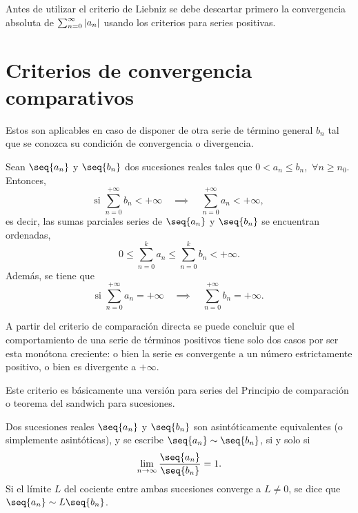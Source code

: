 \begin{note}
    Antes de utilizar el criterio de Liebniz se debe descartar primero la convergencia absoluta de $\sum_{n=0}^\infty \left\vert a_n \right\vert$ usando los criterios para series positivas.
\end{note}

\section{Criterios de convergencia comparativos}
Estos son aplicables en caso de disponer de otra serie de término general $b_n$ tal que se conozca su condición de convergencia o divergencia.

\begin{prop}
    Sean $\seq{a_n}$ y $\seq{b_n}$ dos sucesiones reales tales que
    $0 < a_n \leq b_n$,\ $\forall n\geq n_0$. Entonces,
    \begin{equation}
        \textrm{si } \sum_{n=0}^{+\infty} b_n < +\infty \quad\implies\quad \sum_{n=0}^{+\infty} a_n < +\infty,
    \end{equation}
    es decir, las sumas parciales series de $\seq{a_n}$ y $\seq{b_n}$ se encuentran ordenadas,
    \begin{equation}
        0 \leq \sum_{n=0}^k a_n \leq \sum_{n=0}^k b_n < +\infty.
    \end{equation}
    Además, se tiene que
    \begin{equation}
        \textrm{si } \sum_{n=0}^{+\infty} a_n = +\infty \quad\implies\quad \sum_{n=0}^{+\infty} b_n = +\infty.
    \end{equation}
\end{prop}

A partir del criterio de comparación directa se puede concluir que el comportamiento de una serie de términos positivos tiene solo dos casos por ser esta monótona creciente: o bien la serie es convergente a un número estrictamente positivo, o bien es divergente a $+\infty$.

\begin{note}
    Este criterio es básicamente una versión para series del Principio de comparación o teorema del sandwich para sucesiones.
\end{note}

\begin{defi}
    Dos sucesiones reales $\seq{a_n}$ y $\seq{b_n}$ son asintóticamente equivalentes (o simplemente asintóticas), y se escribe $\seq{a_n}\sim\seq{b_n}$, si y solo si
    \begin{equation}
        \lim_{n\to\infty} \frac{\seq{a_n}}{\seq{b_n}} = 1.
    \end{equation}
    Si el límite $L$ del cociente entre ambas sucesiones converge a $L\neq 0$, se dice que $\seq{a_n}\sim L\seq{b_n}$.
\end{defi}

